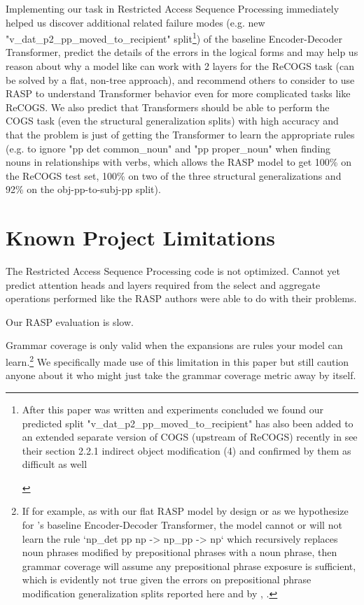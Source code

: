 \documentclass[11pt]{article}
\begin{document}
Implementing our task in Restricted Access Sequence Processing immediately helped us discover additional related failure modes (e.g. new "v\_dat\_p2\_pp\_moved\_to\_recipient" split\footnote{
\begin{tiny}
After this paper was written and experiments concluded we found our predicted split "v\_dat\_p2\_pp\_moved\_to\_recipient" has also been added to an extended separate version of COGS (upstream of ReCOGS) recently in \cite{li2023slogstructuralgeneralizationbenchmark} see their section 2.2.1 indirect object modification (4) and confirmed by them as difficult as well
\end{tiny}
}) of the baseline Encoder-Decoder Transformer, predict the details of the errors in the logical forms and may help us reason about why a model like \cite{Wu2023} can work with 2 layers for the ReCOGS task (can be solved by a flat, non-tree approach), and recommend others to consider to use RASP to understand Transformer behavior even for more complicated tasks like ReCOGS. We also predict that Transformers should be able to perform the COGS task (even the structural generalization splits) with high accuracy and that the problem is just of getting the Transformer to learn the appropriate rules (e.g. to ignore "pp det common\_noun" and "pp proper\_noun" when finding nouns in relationships with verbs, which allows the RASP model to get 100\% on the ReCOGS test set, 100\% on two of the three structural generalizations and 92\% on the obj-pp-to-subj-pp split).

\section*{Known Project Limitations}

The Restricted Access Sequence Processing code is not optimized. Cannot yet predict attention heads and layers required from the select and aggregate operations performed like the RASP authors \cite{Weiss2021} were able to do with their problems.

Our RASP evaluation is slow.

Grammar coverage \cite{fuzzingbook2023:GrammarCoverageFuzzer} is only valid when the expansions are rules your model can learn.\footnote{
If for example, as with our flat RASP model by design or as we hypothesize for \cite{Wu2023}'s baseline Encoder-Decoder Transformer, the model cannot or will not learn the rule `np\_det pp np -> np\_pp -> np` which recursively replaces noun phrases modified by prepositional phrases with a noun phrase, then grammar coverage will assume any prepositional phrase exposure is sufficient, which is evidently not true given the errors on prepositional phrase modification generalization splits reported here and by \cite{Wu2023}, \cite{KimLinzen2020}.
} We specifically made use of this limitation in this paper but still caution anyone about it who might just take the grammar coverage metric away by itself.
\end{document}
